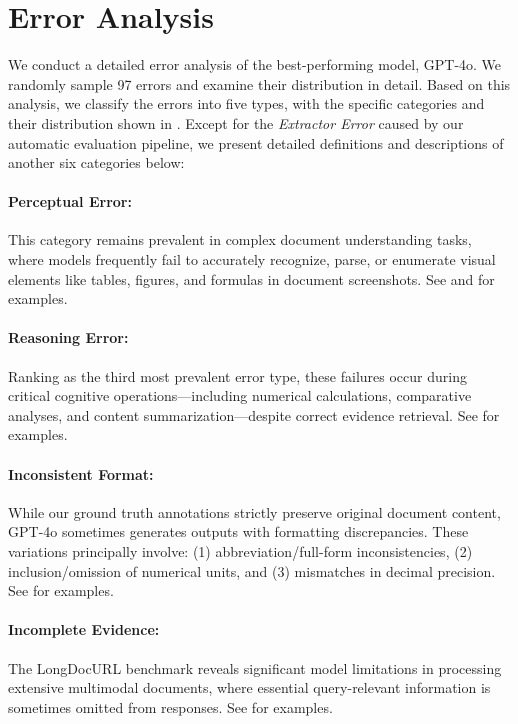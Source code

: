 \section{Error Analysis}
\label{xsec:error_analysis}

We conduct a detailed error analysis of the best-performing model, GPT-4o. We randomly sample 97 errors and examine their distribution in detail. Based on this analysis, we classify the errors into five types, with the specific categories and their distribution shown in . Except for the \emph{Extractor Error} caused by our automatic evaluation pipeline, we present detailed definitions and descriptions of another six categories below:

\paragraph{Perceptual Error:} This category remains prevalent in complex document understanding tasks, where models frequently fail to accurately recognize, parse, or enumerate visual elements like tables, figures, and formulas in document screenshots. See  and  for examples.

\paragraph{Reasoning Error:} Ranking as the third most prevalent error type, these failures occur during critical cognitive operations—including numerical calculations, comparative analyses, and content summarization—despite correct evidence retrieval. See  for examples.

\paragraph{Inconsistent Format:} While our ground truth annotations strictly preserve original document content, GPT-4o sometimes generates outputs with formatting discrepancies. These variations principally involve: (1) abbreviation/full-form inconsistencies, (2) inclusion/omission of numerical units, and (3) mismatches in decimal precision. See  for examples.

\paragraph{Incomplete Evidence:} The LongDocURL benchmark reveals significant model limitations in processing extensive multimodal documents, where essential query-relevant information is sometimes omitted from responses. See  for examples.

